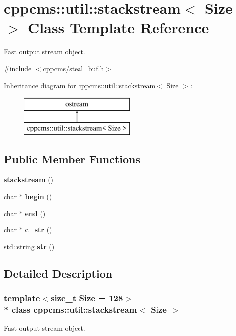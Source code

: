 \section{cppcms\+:\+:util\+:\+:stackstream$<$ Size $>$ Class Template Reference}
\label{classcppcms_1_1util_1_1stackstream}


Fast output stream object.  




{\ttfamily \#include $<$cppcms/steal\+\_\+buf.\+h$>$}

Inheritance diagram for cppcms\+:\+:util\+:\+:stackstream$<$ Size $>$\+:\begin{figure}[H]
\begin{center}
\leavevmode
\includegraphics[height=2.000000cm]{classcppcms_1_1util_1_1stackstream}
\end{center}
\end{figure}
\subsection*{Public Member Functions}
\begin{DoxyCompactItemize}
\item 
{\bf stackstream} ()
\item 
char $\ast$ {\bf begin} ()
\item 
char $\ast$ {\bf end} ()
\item 
char $\ast$ {\bf c\+\_\+str} ()
\item 
std\+::string {\bf str} ()
\end{DoxyCompactItemize}


\subsection{Detailed Description}
\subsubsection*{template$<$size\+\_\+t Size = 128$>$\\*
class cppcms\+::util\+::stackstream$<$ Size $>$}

Fast output stream object. 

